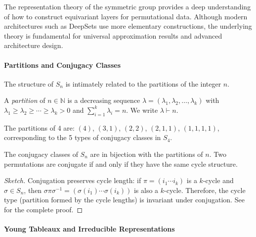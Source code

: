 The representation theory of the symmetric group provides a deep understanding of how to construct equivariant layers for permutational data. Although modern architectures such as DeepSets use more elementary constructions, the underlying theory is fundamental for universal approximation results and advanced architecture design.

\paragraph{Partitions and Conjugacy Classes}

The structure of $S_n$ is intimately related to the partitions of the integer $n$.

\begin{definition}[Partition]\label{def:partition_integer}
A \textit{partition} of $n \in \mathbb{N}$ is a decreasing sequence $\lambda = (\lambda_1, \lambda_2, \ldots, \lambda_k)$ with $\lambda_1 \geq \lambda_2 \geq \cdots \geq \lambda_k > 0$ and $\sum_{i=1}^k \lambda_i = n$. We write $\lambda \vdash n$.
\end{definition}

\begin{example}[Partitions of $n=4$]
The partitions of 4 are: $(4)$, $(3,1)$, $(2,2)$, $(2,1,1)$, $(1,1,1,1)$, corresponding to the 5 types of conjugacy classes in $S_4$.
\end{example}

\begin{theorem}\label{thm:conjugacy_classes_sn}
The conjugacy classes of $S_n$ are in bijection with the partitions of $n$. Two permutations are conjugate if and only if they have the same cycle structure.
\end{theorem}

\begin{proof}[Sketch]
Conjugation preserves cycle length: if $\pi = (i_1 \cdots i_k)$ is a $k$-cycle and $\sigma \in S_n$, then $\sigma \pi \sigma^{-1} = (\sigma(i_1) \cdots \sigma(i_k))$ is also a $k$-cycle. Therefore, the cycle type (partition formed by the cycle lengths) is invariant under conjugation. See \citep{sagan2001symmetric} for the complete proof.
\end{proof}

\paragraph{Young Tableaux and Irreducible Representations}

